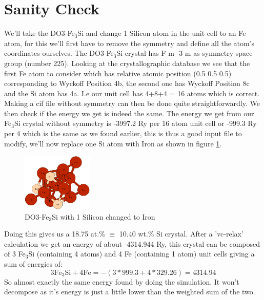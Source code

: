\documentclass[twoside,twocolumn,11pt]{article} %
\begin{document}
\section{Sanity Check}
We'll take the DO3-Fe$_3$Si and change 1 Silicon atom in the unit
cell to an Fe atom, for this we'll first have to remove the 
symmetry and define all the atom's coordinates ourselves.
The DO3-Fe$_3$Si crystal has F m -3 m as symmetry space group
(number 225). Looking at the crystallographic database
we see that the first Fe atom to consider which has relative atomic 
position (0.5 0.5 0.5) corresponding to Wyckoff Position 4b,
the second one has Wyckoff Position 8c and the Si atom has 4a.
I.e our unit cell has 4+8+4 = 16 atoms which is correct.
\newline
Making a cif file without symmetry can then be done quite
straightforwardly. We then check if the energy we get is indeed the
same. The energy we get from our Fe$_3$Si crystal without symmetry
is -3997.2 Ry per 16 atom unit cell or -999.3 Ry per 4 which is the
same as we found earlier, this is thus a good input file to modify,
we'll now replace one Si atom with Iron as shown in figure
\ref{fig:Sanity}.
\begin{figure}
	\centering
	\includegraphics[width=0.3\textwidth]{figures/Sanitynolight.png}
	\caption{DO3-Fe$_3$Si with 1 Silicon changed to Iron}
	\label{fig:Sanity}
\end{figure}
Doing this gives us a 18.75 at.\% $\equiv$ 10.40 wt.\% Si crystal.
After a 'vc-relax' calculation we get an energy of about -4314.944
Ry, this crystal can be composed of 3 Fe$_3$Si (containing 4 atoms)
and 4 Fe (containing 1 atom) unit cells giving a sum of energies of:
\begin{equation}
	3 \text{Fe}_3\text{Si} + 4 \text{Fe} = -( 3* 999.3 + 4*329.26) = 4314.94
\end{equation}
So almost exactly the same energy found by doing the simulation.
It won't decompose as it's energy is just a little lower than 
the weighted sum of the two.



\end{document}
